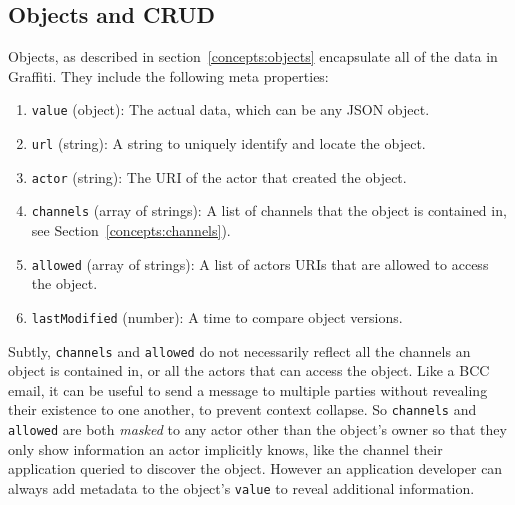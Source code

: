 
\subsection{Objects and CRUD}

Objects, as described in section~\ref{concepts:objects} encapsulate
all of the data in Graffiti.
They include the following meta properties:
\begin{enumerate}
\item
\texttt{value} (object): The actual data, which can be any JSON object.
\item
\texttt{url} (string): A string to uniquely identify and locate the object.
\item
\texttt{actor} (string): The URI of the actor that created the object.
\item
\texttt{channels} (array of strings): A list of channels that the object is contained in, see Section~\ref{concepts:channels}).
\item
\texttt{allowed} (array of strings): A list of actors URIs that are allowed to access the object.
\item
\texttt{lastModified} (number): A time to compare object versions.
\end{enumerate}

Subtly, \texttt{channels} and \texttt{allowed} do not necessarily
reflect all the channels an object is contained in, or
all the actors that can access the object.
Like a BCC email, it can be useful to send a message to multiple parties
without revealing their existence to one another, to prevent
context collapse.
So \texttt{channels} and \texttt{allowed} are both \emph{masked} to any
actor other than the object's owner so that they only show information an actor implicitly knows,
like the channel their application queried to discover the object.
However an application developer can always
add metadata to the object's \texttt{value}
to reveal additional information.

